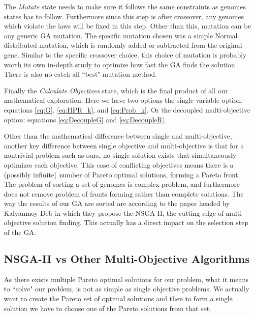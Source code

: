 \documentclass[11pt]{article}
\begin{document}
    The \textit{Mutate} state needs to make sure it follows the same constraints as
    genomes states has to follow. Furthermore since this step is after crossover,
    any genomes which violate the laws will be fixed in this step. Other than this,
    mutation can be any generic GA mutation. The specific mutation chosen was a
    simple Normal distributed mutation, which is randomly added or subtracted from
    the original gene. Similar to the specific crossover choice, this choice
    of mutation is probably worth its own in-depth study to optimize how fast
    the GA finds the solution. There is also no catch all ``best" mutation method.

    Finally the \textit{Calculate Objectives} state, which is the final product of all our
    mathematical exploration. Here we have two options the single variable option: equations
    \ref{eq:G}, \ref{eq:HPR_k}, and \ref{eq:Prob_k}. Or the decoupled multi-objective
    option: equations \ref{eq:DecoupleG} and \ref{eq:DecoupleR}.

    Other than the mathematical difference between single and multi-objective,
    another key difference between single objective and multi-objective is that for a
    nontrivial problem such as ours, no single solution exists that simultaneously
    optimizes each objective. This case of conflicting objectives means there is
    a (possibly infinite) number of Pareto optimal solutions, forming a Pareto front.
    The problem of sorting a set of genomes is complex problem, and furthermore
    does not remove problem of fronts forming rather than complete solutions.
    The way the results of our GA are sorted are according to the paper headed by
    Kalyanmoy Deb \cite{DebPratapAgarwalMeyarivan} in which they propose the
    NSGA-II, the cutting edge of multi-objective solution finding. This actually
    has a direct impact on the selection step of the GA.

\subsection{NSGA-II vs Other Multi-Objective Algorithms}

    As there exists multiple Pareto optimal solutions for our problem, what it means to ``solve"
    our problem, is not as simple as single objective problems. We actually want to create the
    Pareto set of optimal solutions and then to form a single solution we have to choose one of
    the Pareto solutions from that set.
\end{document}
